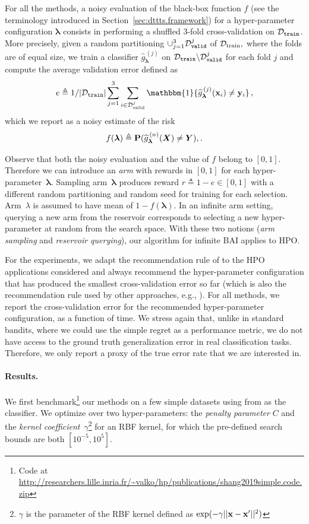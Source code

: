 For all the methods, a noisy evaluation of the black-box function $f$ (see the terminology introduced in Section~\ref{sec:dttts.framework}) for a hyper-parameter configuration $\bm\lambda$ consists in performing a shuffled 3-fold cross-validation on $\mathcal{D}_{\texttt{train}}$. More precisely, given a random partitioning $\cup_{j=1}^3\mathcal{D}_{\texttt{valid}}^j$ of $\mathcal{D}_{\text{train}},$ where the folds are of equal size, we train a classifier $\hat{g}^{\,(j)}_{\bm\lambda}$ on $\mathcal{D}_{\texttt{train}} \backslash \mathcal{D}_{\texttt{valid}}^j$ for each fold $j$ and compute the average validation error defined as 
\[
    e \triangleq 1/|\cD_{\texttt{train}}|\sum_{j=1}^{3} \sum_{i \in \cD_{\text{valid}}^j} \mathbbm{1}\{\hat{g}^{\,(j)}_{\blambda}(\bx_i)\neq\by_i\}\,,
\]
which we report as a noisy estimate of the risk 
\[
    f(\bm\lambda) \triangleq {\bf P}(\widehat{g}^{\,(n)}_{\bm\lambda}(\bm X) \neq \bm Y),.
\]

Observe that both the noisy evaluation and the value of $f$ belong to $[0,1]$. Therefore we can introduce an \textit{arm} with rewards in $[0,1]$ for each hyper-parameter~$\bm\lambda$. Sampling  arm~$\bm\lambda$ produces reward $r \triangleq 1-e \in [0,1]$ with a different random partitioning and random seed for training for each selection. Arm~$\lambda$ is assumed to have mean of $1-f(\bm\lambda)$. In an infinite arm setting, querying a new arm from the reservoir corresponds to selecting a new hyper-parameter at random from the search space. With these two notions (\textit{arm sampling} and \textit{reservoir querying}), our algorithm for infinite BAI applies to HPO.  

For the experiments, we adapt the recommendation rule of \DTTTS to the HPO applications considered and always recommend the hyper-parameter configuration that has produced the smallest cross-validation error so far (which is also the recommendation rule used by other approaches, e.g., \Hyperband). For all methods, we report the cross-validation error for the recommended hyper-parameter configuration, as a function of time. We stress again that, unlike in standard bandits, where we could use the simple regret as a performance metric, we do not have access to the ground truth generalization error in real classification tasks. Therefore, we only report a proxy of the true error rate that we are interested in.

\paragraph{Results.} We first benchmark\footnote{Code at \url{http://researchers.lille.inria.fr/~valko/hp/publications/shang2019simple.code.zip}} our methods on a few simple \UCI datasets using \SVM from \Scikit as the classifier. We  optimize over two hyper-parameters: the \emph{penalty parameter} $C$ and the \emph{kernel coefficient}~$\gamma$\footnote{$\gamma$ is the parameter of the RBF kernel defined as $\exp(-\gamma||{\bf x}-{\bf x}'||^2)$}
for an RBF kernel, for which the pre-defined search bounds are both $\left[10^{-5}, 10^{5} \right]$.

